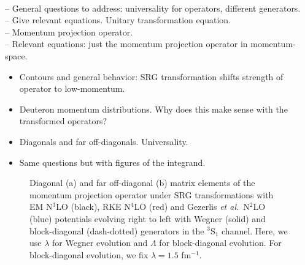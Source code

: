 \documentclass[preprintnumbers,floatfix,aps,prc,preprint,nofootinbib]{revtex4-1}
\begin{document}
\\
-- General questions to address: universality for operators, different generators.
\\
-- Give relevant equations. Unitary transformation equation.
\\
-- Momentum projection operator.
\\
-- Relevant equations: just the momentum projection operator in momentum-space.
%
\begin{itemize}
	\item Contours and general behavior: SRG transformation shifts strength of operator to low-momentum.
	\item Deuteron momentum distributions. Why does this make sense with the transformed operators?
	\item Diagonals and far off-diagonals. Universality.
	\item Same questions but with figures of the integrand.
\end{itemize}
%
\begin{figure}[H]
	\centering
	
	\caption{Diagonal (a) and far off-diagonal (b) matrix elements of the momentum projection operator under SRG transformations with EM N$^3$LO (black), RKE N$^4$LO (red) and Gezerlis \textit{et al.}~N$^2$LO (blue) potentials evolving right to left with Wegner (solid) and block-diagonal (dash-dotted) generators in the $^3$S$_1$ channel. Here, we use $\lambda$ for Wegner evolution and $\Lambda$ for block-diagonal evolution. For block-diagonal evolution, we fix $\lambda=1.5$ fm$^{-1}$.}
	\label{fig:momentum_proj_3S1}
\end{figure}
\end{document}
